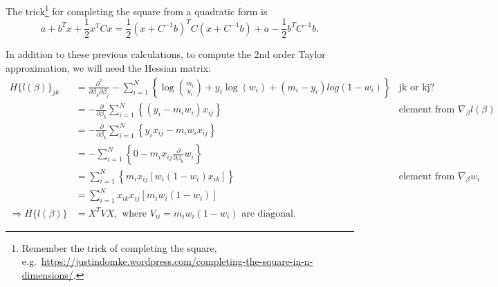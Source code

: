 \documentclass{article}
\begin{document}
\begin{enumerate}[(A)]
\color{blue}
The trick\footnote{Remember the trick of completing the square, e.g.~\url{https://justindomke.wordpress.com/completing-the-square-in-n-dimensions/}.} 
for completing the square  from a quadratic form is \begin{equation}a + b^Tx + \frac{1}{2} x^T Cx = \frac{1}{2}(x+C^{-1}b)^T C (x+C^{-1}b) + a - \frac{1}{2}b^TC^{-1}b.\label{completedsquare} \end{equation}

In addition to these previous calculations, to compute the 2nd order Taylor approximation, we will need the Hessian matrix: 
\begin{align*}
H\{l(\beta)\}_{jk} &= \frac{\partial^2}{\partial \beta_k \partial \beta_j } -   \sum_{i=1}^N  \left \{ \log\binom{m_i}{y_i} + y_i\log(w_i) + (m_i-y_i)log(1-w_i) \right \}  & \text{jk or kj?}\\
&= - \frac{\partial}{\partial \beta_k }    \sum_{i=1}^N  \left \{ (y_i - m_iw_i)x_{ij} \right\} &\text{element from $\nabla_\beta l(\beta)$}\\
&= - \frac{\partial}{\partial \beta_k }    \sum_{i=1}^N  \left \{ y_ix_{ij} - m_iw_ix_{ij} \right\} \\
&= -    \sum_{i=1}^N  \left \{ 0 - m_i x_{ij}\frac{\partial}{\partial \beta_k } w_i \right\} \\
&= \sum_{i=1}^N  \left \{ m_i x_{ij} \left[ w_i(1 - w_i)x_{ik}\right] \right\} &\text{element from $\nabla_\beta w_i$}\\
&= \sum_{i=1}^N   x_{ik} x_{ij} \left[ m_iw_i(1 - w_i)\right]  \\
\Rightarrow H\{l(\beta)\} &=  X^TVX, \text{ where $V_{ii} = m_iw_i(1 - w_i)$ are diagonal.}  
\end{align*}


\end{enumerate}
\end{document}
